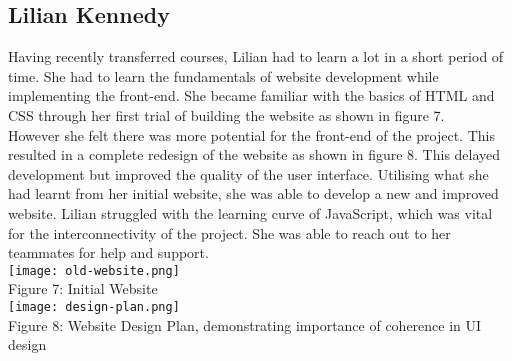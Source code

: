 \subsection{Lilian Kennedy}
Having recently transferred courses, Lilian had to learn a lot in a short period of time. She had to learn the fundamentals of website development while implementing the front-end. She became familiar with the basics of HTML and CSS through her first trial of building the website as shown in figure 7. \\

However she felt there was more potential for the front-end of the project. This resulted in a complete redesign of the website as shown in figure 8. This delayed development but improved the quality of the user interface. Utilising what she had learnt from her initial website, she was able to develop a new and improved website. Lilian struggled with the learning curve of JavaScript, which was vital for the interconnectivity of the project. She was able to reach out to her teammates for help and support.\\

\texttt{[image: old-website.png]}\\
Figure 7: Initial Website\\

\texttt{[image: design-plan.png]}\\
Figure 8: Website Design Plan, demonstrating importance of coherence in UI design\\
